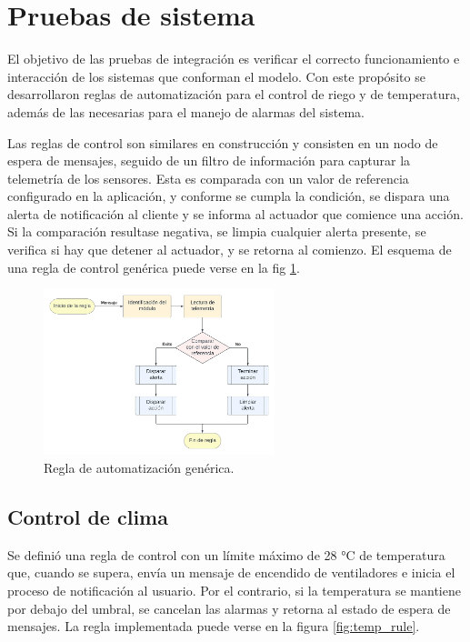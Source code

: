 \section{Pruebas de sistema}
\label{sec:Pruebas de sistema}

El objetivo de las pruebas de integración es verificar el correcto funcionamiento e interacción de los sistemas que conforman el modelo. Con este propósito se desarrollaron reglas de automatización para el control de riego y de temperatura, además de las necesarias para el manejo de alarmas del sistema. 

Las reglas de control son similares en construcción y consisten en un nodo de espera de mensajes, seguido de un filtro de información para capturar la telemetría de los sensores. Esta es comparada con un valor de referencia configurado en la aplicación, y conforme se cumpla la condición, se dispara una alerta de notificación al cliente y se informa al actuador que comience una acción. Si la comparación resultase negativa, se limpia cualquier alerta presente, se verifica si hay que detener al actuador, y se retorna al comienzo.
El esquema de una regla de control genérica puede verse en la fig \ref{fig:basic_rule}.

\begin{figure}[h]
	\centering
	\includegraphics[width=0.6\textwidth]{./Figures/chapter4/ReglaBasica.jpg}
	\caption[Regla de automatización genérica]{Regla de automatización genérica.}
	\label{fig:basic_rule}
\end{figure}

\pagebreak

\subsection{Control de clima}
\label{sec:Control de clima}

Se definió una regla de control con un límite máximo de 28 °C de temperatura que, cuando se supera, envía un mensaje de encendido de ventiladores e inicia el proceso de notificación  al usuario. Por el contrario, si la temperatura se mantiene por debajo del umbral, se cancelan las alarmas y retorna al estado de espera de mensajes. La regla implementada puede verse en la figura \ref{fig:temp_rule}.  

